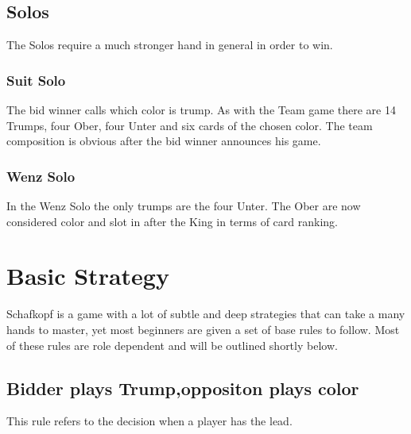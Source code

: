 \subsection{Solos}
The Solos require a much stronger hand in general in order to win.

\subsubsection{Suit Solo}
The bid winner calls which color is trump.
As with the Team game there are 14 Trumps, four Ober, four Unter and six cards of the chosen color.
The team composition is obvious after the bid winner announces his game.

\subsubsection{Wenz Solo}
In the Wenz Solo the only trumps are the four Unter.
The Ober are now considered color and slot in after the King in terms of card ranking.


\section{Basic Strategy}
Schafkopf is a game with a lot of subtle and deep strategies that can take a many hands to master, yet most beginners
are given a set of base rules to follow.
Most of these rules are role dependent and will be outlined shortly below.

\subsection{Bidder plays Trump,oppositon plays color}
This rule refers to the decision when a player has the lead.
